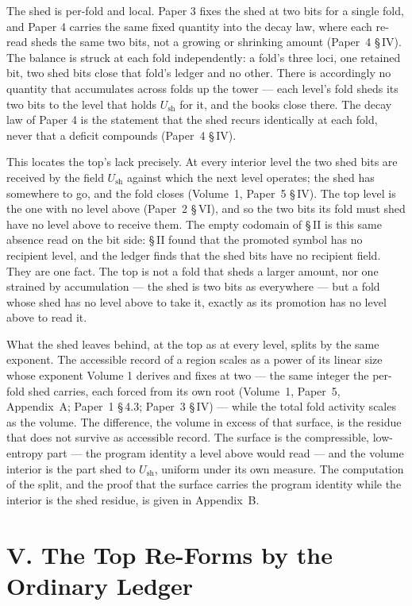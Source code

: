 \documentclass[11pt,oneside]{report}
\theoremstyle{definition}
\theoremstyle{remark}
\begin{document}
The shed is per-fold and local. Paper 3 fixes the shed at two bits for a single fold, and Paper 4
carries the same fixed quantity into the decay law, where each re-read sheds the same two bits, not
a growing or shrinking amount (Paper~4 \S\,IV). The balance is struck at each fold independently: a
fold's three loci, one retained bit, two shed bits close that fold's ledger and no other. There is
accordingly no quantity that accumulates across folds up the tower --- each level's fold sheds its
two bits to the level that holds \ensuremath{U_{\mathrm{sh}}} for it, and the books close there. The
decay law of Paper 4 is the statement that the shed recurs identically at each fold, never that a
deficit compounds (Paper~4 \S\,IV).

This locates the top's lack precisely. At every interior level the two shed bits are received by
the field \ensuremath{U_{\mathrm{sh}}} against which the next level operates; the shed has somewhere
to go, and the fold closes (Volume~1, Paper~5 \S\,IV). The top level is the one with no level above
(Paper~2 \S\,VI), and so the two bits its fold must shed have no level above to receive them. The
empty codomain of \S\,II is this same absence read on the bit side: \S\,II found that the promoted
symbol has no recipient level, and the ledger finds that the shed bits have no recipient field.
They are one fact. The top is not a fold that sheds a larger amount, nor one strained by
accumulation --- the shed is two bits as everywhere --- but a fold whose shed has no level above to
take it, exactly as its promotion has no level above to read it.

What the shed leaves behind, at the top as at every level, splits by the same exponent. The
accessible record of a region scales as a power of its linear size whose exponent Volume 1 derives
and fixes at two --- the same integer the per-fold shed carries, each forced from its own root
(Volume~1, Paper~5, Appendix~A; Paper~1 \S\,4.3; Paper~3 \S\,IV) --- while the total fold activity
scales as the volume. The difference, the volume in excess of that surface, is the residue that
does not survive as accessible record. The surface is the compressible, low-entropy part --- the
program identity a level above would read --- and the volume interior is the part shed to
\ensuremath{U_{\mathrm{sh}}}, uniform under its own measure. The computation of the split, and the
proof that the surface carries the program identity while the interior is the shed residue, is
given in Appendix~B.

\section*{V. The Top Re-Forms by the Ordinary Ledger}
\end{document}
